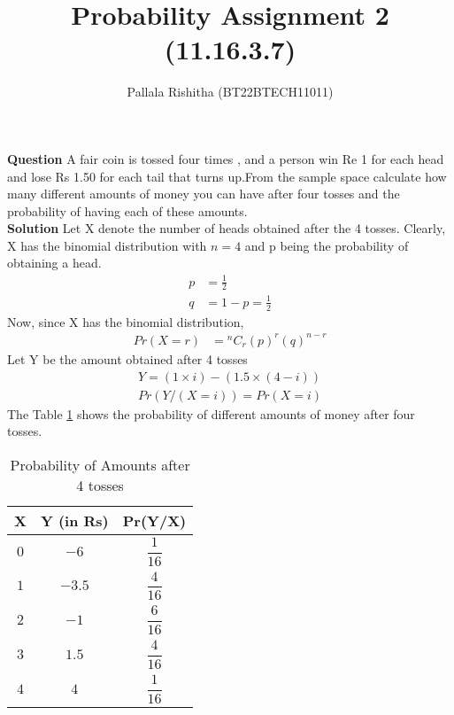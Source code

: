 \documentclass[12pt,twocolumn,notitlepage]{article}
\title{Probability Assignment 2 (11.16.3.7)}
\author{Pallala Rishitha (BT22BTECH11011)}
\date{}
\providecommand{\brak}[1]{\ensuremath{\left(#1\right)}}
\newcommand*{\comb}[2]{{}^{#1}C_{#2}}
\begin{document}
\maketitle
\textbf{Question}
A fair coin is tossed four times , and a person win Re 1 for each head and lose Rs 1.50 for each tail that turns up.From the sample space calculate how many different amounts of money you can have after four tosses and the
probability of having each of these amounts. \\
\textbf{Solution}
Let X denote the number of heads obtained after the 4 tosses. Clearly, X has the binomial distribution with $n=4$ and p being the probability of obtaining a head.
\begin{align}
    p &= \frac{1}{2} \\ 
    q &=1-p = \frac{1}{2}     
\end{align}
Now, since X has the binomial distribution,
\begin{align}
 Pr\brak{X=r} &= \comb{n}{r}\brak{p}^{r}\brak{q}^{n-r} 
\end{align}
Let Y be the amount obtained after 4 tosses
\begin{align}
    Y= (1\times i) - (1.5\times(4-i))\\
  Pr\brak{ Y/ \brak{X=i} } = Pr\brak{X=i}
 \end{align}
The Table \ref{table:1} shows the probability of different amounts of money after four tosses.
 \setlength{\tabcolsep}{18pt}
 \renewcommand{\arraystretch}{2.15}
\begin{table}[h!]
\raggedleft
\begin{tabular}{||c|c|c||} 
 \hline
 X  &  Y (in Rs)& Pr(Y/X)  \\ 
 \hline
 \hline
 $0$ & $-6$  & $\dfrac{1}{16} $  \\  
 \hline 
 $1$ & $-3.5$& $\dfrac{4}{16} $  \\ \hline 
 $2$ & $-1$  & $\dfrac{6}{16} $  \\\hline 
 $3$& $1.5$ & $\dfrac{4}{16}$   \\\hline 
 $4$ & $4$  & $\dfrac{1}{16}$   \\ 
 \hline
\end{tabular}
\caption{Probability of Amounts after 4 tosses}
\label{table:1}
\end{table}
\end{document}
